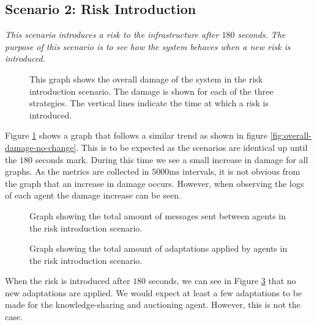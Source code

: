 \subsection{Scenario 2: Risk Introduction}
\textit{This scenario introduces a risk to the infrastructure after $180$ seconds. The purpose of this scenario is to see how the system behaves when a new risk is introduced.}

\begin{figure}[H]
    \centering
    
    \caption{This graph shows the overall damage of the system in the risk introduction scenario. The damage is shown for each of the three strategies. The vertical lines indicate the time at which a risk is introduced.}
    \label{fig:overall-damage-inroduce-risk}
\end{figure}

Figure \ref{fig:overall-damage-inroduce-risk} shows a graph that follows a similar trend as shown in figure \ref{fig:overall-damage-no-change}. This is to be expected as the scenarios are identical up until the $180$ seconds mark. During this time we see a small increase in damage for all graphs. As the metrics are collected in $5000$ms intervals, it is not obvious from the graph that an increase in damage occurs. However, when observing the logs of each agent the damage increase can be seen. 

\begin{figure}[H]
    \centering
    
    \caption{Graph showing the total amount of messages sent between agents in the risk introduction scenario.}
    \label{fig:messages-risk-introduction}
\end{figure}
\begin{figure}[H]
    \centering
    
    \caption{Graph showing the total amount of adaptations applied by agents in the risk introduction scenario.}
    \label{fig:proposals-risk-introduction}
\end{figure}

When the risk is introduced after $180$ seconds, we can see in Figure \ref{fig:proposals-risk-introduction} that no new adaptations are applied. We would expect at least a few adaptations to be made for the knowledge-sharing and auctioning agent. However, this is not the case.

